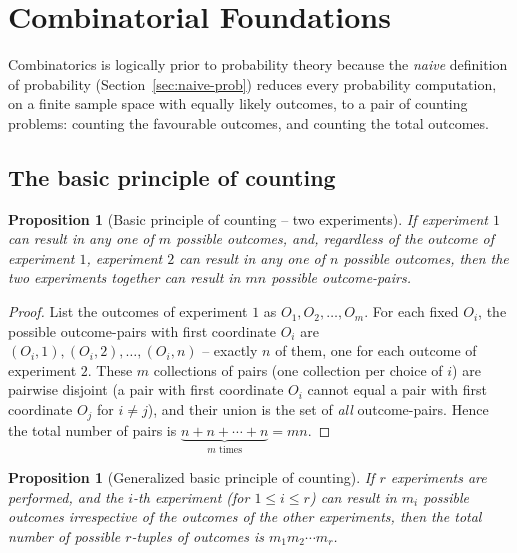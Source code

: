 \documentclass[11pt]{article}
\theoremstyle{definition}
\theoremstyle{plain}
\newtheorem{proposition}[definition]{Proposition}
\theoremstyle{remark}
\begin{document}
\newpage
\section{Combinatorial Foundations}

Combinatorics is logically prior to probability theory because the \emph{naive} definition of
probability (Section~\ref{sec:naive-prob}) reduces every probability computation, on a finite
sample space with equally likely outcomes, to a pair of counting problems: counting the
favourable outcomes, and counting the total outcomes.

\subsection{The basic principle of counting}

\begin{proposition}[Basic principle of counting -- two experiments]
\label{prop:basic-counting-2}
If experiment $1$ can result in any one of $m$ possible outcomes, and, regardless of the outcome
of experiment $1$, experiment $2$ can result in any one of $n$ possible outcomes, then the two
experiments together can result in $mn$ possible outcome-pairs.
\end{proposition}

\begin{proof}
List the outcomes of experiment $1$ as $O_1, O_2, \dots, O_m$. For each fixed $O_i$, the possible
outcome-pairs with first coordinate $O_i$ are $(O_i, 1), (O_i,2), \dots, (O_i, n)$ -- exactly $n$
of them, one for each outcome of experiment $2$. These $m$ collections of pairs (one collection
per choice of $i$) are pairwise disjoint (a pair with first coordinate $O_i$ cannot equal a pair
with first coordinate $O_j$ for $i \ne j$), and their union is the set of \emph{all}
outcome-pairs. Hence the total number of pairs is
$\underbrace{n + n + \cdots + n}_{m \text{ times}} = mn$.
\end{proof}

\begin{proposition}[Generalized basic principle of counting]
If $r$ experiments are performed, and the $i$-th experiment (for $1 \le i \le r$) can result in
$m_i$ possible outcomes irrespective of the outcomes of the other experiments, then the total
number of possible $r$-tuples of outcomes is $m_1 m_2 \cdots m_r$.
\end{proposition}
\end{document}
